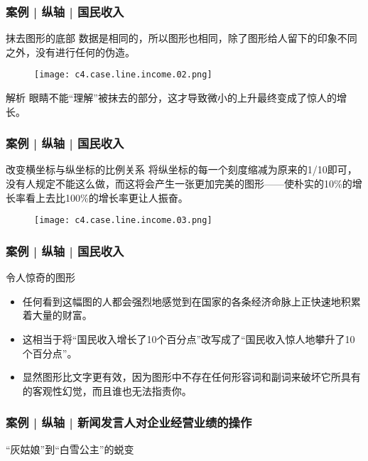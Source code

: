 \begin{frame}
  \frametitle{案例 | 纵轴 | 国民收入}
  \begin{block}{抹去图形的底部}
    数据是相同的，所以图形也相同，除了图形给人留下的印象不同之外，没有进行任何的伪造。
  \end{block}
  \vspace{-0.5em}
  \begin{figure}
    \centering
    \texttt{[image: c4.case.line.income.02.png]}
  \end{figure}
  \pause
  \vspace{-0.5em}
  \begin{block}{解析}
    眼睛不能“理解”被抹去的部分，这才导致微小的上升最终变成了惊人的增长。
  \end{block}
\end{frame}

\begin{frame}
  \frametitle{案例 | 纵轴 | 国民收入}
  \begin{block}{改变横坐标与纵坐标的比例关系}
    将纵坐标的每一个刻度缩减为原来的1/10即可，没有人规定不能这么做，而这将会产生一张更加完美的图形——使朴实的10\%的增长率看上去比100\%的增长率更让人振奋。
  \end{block}
  \vspace{-0.5em}
  \begin{figure}
    \centering
    \texttt{[image: c4.case.line.income.03.png]}
  \end{figure}
\end{frame}

\begin{frame}
  \frametitle{案例 | 纵轴 | 国民收入}
  \begin{block}{令人惊奇的图形}
    \begin{itemize}
      \item 任何看到这幅图的人都会强烈地感觉到在国家的各条经济命脉上正快速地积累着大量的财富。
      \item 这相当于将“国民收入增长了10个百分点”改写成了“国民收入惊人地攀升了10个百分点”。
      \item 显然图形比文字更有效，因为图形中不存在任何形容词和副词来破坏它所具有的客观性幻觉，而且谁也无法指责你。
    \end{itemize}
  \end{block}
\end{frame}

\begin{frame}
  \frametitle{案例 | 纵轴 | 新闻发言人对企业经营业绩的操作}
  \begin{block}{“灰姑娘”到“白雪公主”的蜕变}
    \begin{figure}
      \centering
    \end{figure}
  \end{block}
\end{frame}

